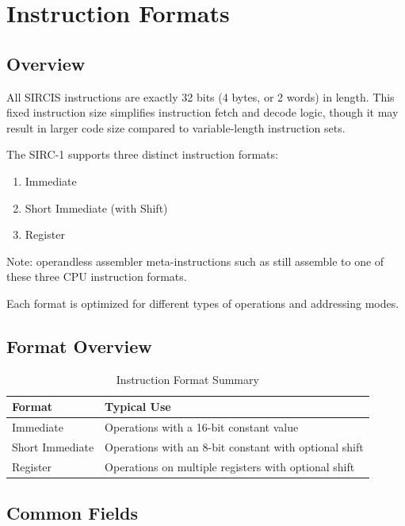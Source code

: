 \chapter{Instruction Formats}
\label{ch:instruction-formats}

\section{Overview}

All SIRCIS instructions are exactly 32 bits (4 bytes, or 2 words) in length. This fixed instruction size simplifies
instruction fetch and decode logic, though it may result in larger code size compared to variable-length instruction
sets.

The SIRC-1 supports three distinct instruction formats:

\begin{enumerate}
	\item Immediate
	\item Short Immediate (with Shift)
	\item Register
\end{enumerate}

Note: operandless assembler meta-instructions such as  still assemble to one of these three CPU
instruction formats.

Each format is optimized for different types of operations and addressing modes.

\section{Format Overview}

\begin{table}[H]
	\centering
	\small
	\begin{tabular}{lp{9cm}}
		\toprule
		\textbf{Format} & \textbf{Typical Use}                                  \\
		\midrule
		Immediate       & Operations with a 16-bit constant value               \\
		Short Immediate & Operations with an 8-bit constant with optional shift \\
		Register        & Operations on multiple registers with optional shift  \\
		\bottomrule
	\end{tabular}
	\caption{Instruction Format Summary}
	\label{tab:format-summary}
\end{table}

\section{Common Fields}

